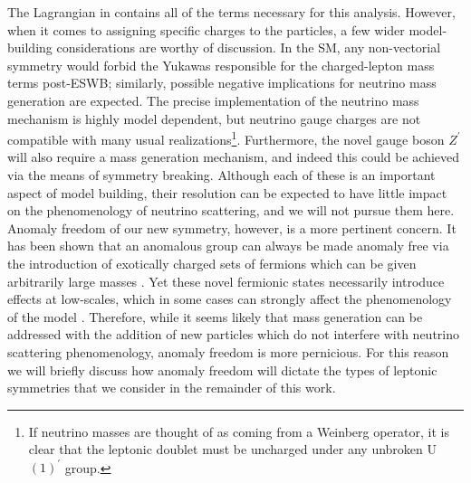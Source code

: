 The Lagrangian in  contains all of the terms necessary for this analysis. However, when it comes to assigning specific charges to the particles, a few wider model-building considerations are worthy of discussion. In the SM, any non-vectorial symmetry would forbid the Yukawas responsible for the charged-lepton mass terms post-ESWB; similarly, possible negative implications for neutrino mass generation are expected. The precise implementation of the neutrino mass mechanism is highly model dependent, but neutrino gauge charges are not compatible with many usual realizations\footnote{If neutrino masses are thought of as coming from a Weinberg operator, it is clear that the leptonic doublet must be uncharged under any unbroken U$(1)^\prime$ group.}. Furthermore, the novel gauge boson $Z^\prime$ will also require a mass generation mechanism, and indeed this could be achieved via the means of symmetry breaking. Although each of these is an important aspect of model building, their resolution can be expected to have little impact on the phenomenology of neutrino scattering, and we will not pursue them here.
%
Anomaly freedom of our new symmetry, however, is a more pertinent concern. It has been shown that an anomalous group can always be made anomaly free via the introduction of exotically charged sets of fermions which can be given arbitrarily large masses \cite{Batra:2005rh}. Yet these novel fermionic states necessarily introduce effects at low-scales, which in some cases can strongly affect the phenomenology of the model \cite{Dror:2017ehi}. Therefore, while it seems likely that mass generation can be addressed with the addition of new particles which do not interfere with neutrino scattering phenomenology, anomaly freedom is more pernicious. For this reason we will briefly discuss how anomaly freedom will dictate the types of leptonic symmetries that we consider in the remainder of this work.

